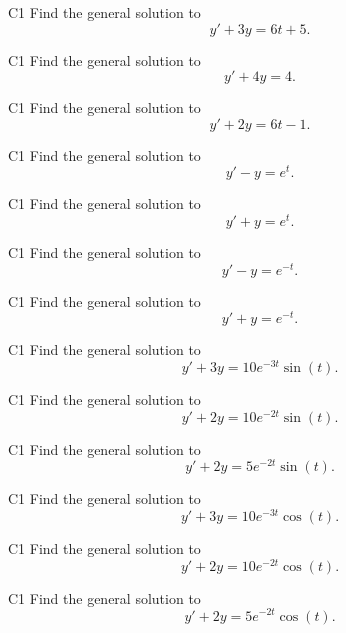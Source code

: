 \begin{problem}{C1}
Find the general solution to
\[
y'+3y=6t+5.
\]
\end{problem}

\begin{problem}{C1}
Find the general solution to
\[
y'+4y=4.
\]
\end{problem}

\begin{problem}{C1}
Find the general solution to
\[
y'+2y=6t-1.
\]
\end{problem}

\begin{problem}{C1}
Find the general solution to
\[
y'-y=e^t.
\]
\end{problem}

\begin{problem}{C1}
Find the general solution to
\[
y'+y=e^t.
\]
\end{problem}

\begin{problem}{C1}
Find the general solution to
\[
y'-y=e^{-t}.
\]
\end{problem}

\begin{problem}{C1}
Find the general solution to
\[
y'+y=e^{-t}.
\]
\end{problem}

\begin{problem}{C1}
Find the general solution to
\[
y'+3y=10e^{-3t}\sin(t).
\]
\end{problem}

\begin{problem}{C1}
Find the general solution to
\[
y'+2y=10e^{-2t}\sin(t).
\]
\end{problem}

\begin{problem}{C1}
Find the general solution to
\[
y'+2y=5e^{-2t}\sin(t).
\]
\end{problem}

\begin{problem}{C1}
Find the general solution to
\[
y'+3y=10e^{-3t}\cos(t).
\]
\end{problem}

\begin{problem}{C1}
Find the general solution to
\[
y'+2y=10e^{-2t}\cos(t).
\]
\end{problem}

\begin{problem}{C1}
Find the general solution to
\[
y'+2y=5e^{-2t}\cos(t).
\]
\end{problem}
